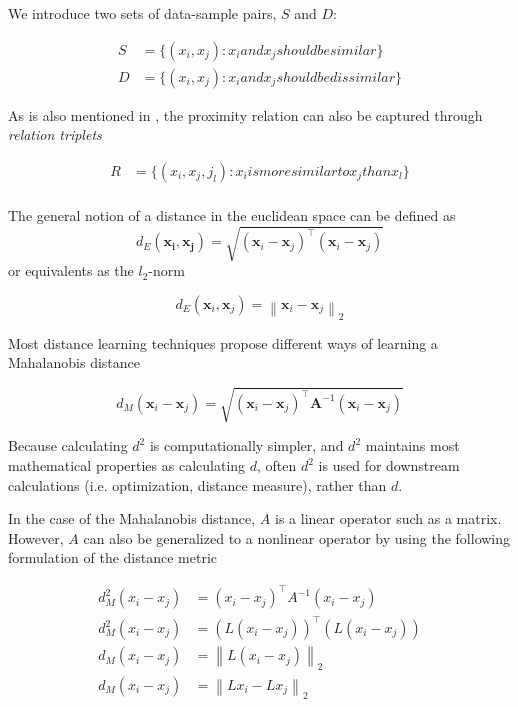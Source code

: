 \documentclass[a4paper,12pt,twoside,openright]{report}
\begin{document}
We introduce two sets of data-sample pairs, $S$ and $D$:

\begin{align}
S &= \{ (x_i, x_j) : x_i and x_j should be similar\} \\
D &= \{ (x_i, x_j) : x_i and x_j should be dissimilar\}
\end{align}

As is also mentioned in \cite{moutafis17}, the proximity relation can also be captured through \textit{relation triplets}

\begin{align}
R &= \{ (x_i, x_j, j_l) : x_i is more similar to x_j than x_l \} \\
\end{align}

The general notion of a distance in the euclidean space can be defined as 
\begin{equation}
d_{E}\left(\boldsymbol{x}_{\boldsymbol{i}}, \boldsymbol{x}_{\boldsymbol{j}}\right)=\sqrt{\left(\boldsymbol{x}_{i}-\boldsymbol{x}_{j}\right)^{\top}\left(\boldsymbol{x}_{i}-\boldsymbol{x}_{j}\right)}
\end{equation}
or equivalents as the $l_2$-norm

\begin{equation}
d_{E}\left(\boldsymbol{x}_{i}, \boldsymbol{x}_{j}\right)=\left\|\boldsymbol{x}_{i}-\boldsymbol{x}_{j}\right\|_{2}
\end{equation}

Most distance learning techniques propose different ways of learning a Mahalanobis distance \cite{mahalanobis36}

\begin{equation}
d_{M}\left(\boldsymbol{x}_{i}-\boldsymbol{x}_{j}\right)=\sqrt{\left(\boldsymbol{x}_{i}-\boldsymbol{x}_{j}\right)^{\top} \boldsymbol{A}^{-1}\left(\boldsymbol{x}_{i}-\boldsymbol{x}_{j}\right)}
\end{equation}

Because calculating $d^2$ is computationally simpler, and $d^2$ maintains most mathematical properties as calculating $d$, often $d^2$ is used for downstream calculations (i.e. optimization, distance measure), rather than $d$.

In the case of the Mahalanobis distance, $A$ is a linear operator such as a matrix.
However, $A$ can also be generalized to a nonlinear operator by using the following formulation of the distance metric

\begin{align}
d_{M}^{2}\left(x_{i}-x_{j}\right) &=\left(x_{i}-x_{j}\right)^{\top} A^{-1}\left(x_{i}-x_{j}\right) \\
d_{M}^{2}\left(x_{i}-x_{j}\right) &= (L\left(x_{i}-x_{j}\right))^{\top} (L\left(x_{i}-x_{j}\right)) \\
d_{M}\left(x_{i}-x_{j}\right) &=\left\|L\left(x_{i}-x_{j}\right)\right\|_{2} \\
d_{M}\left(x_{i}-x_{j}\right) &=\left\|Lx_{i}-Lx_{j}\right\|_{2}
\end{align}
\end{document}
